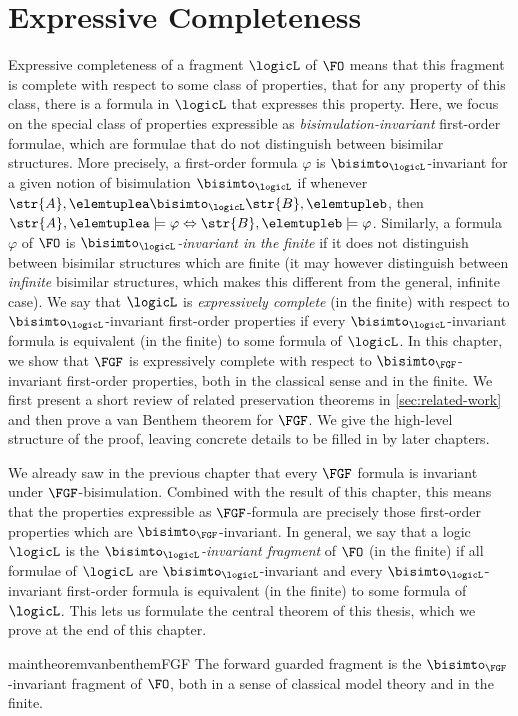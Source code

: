 \chapter{Expressive Completeness}\label{chap:expressivity}
Expressive completeness of a fragment $\logicL$ of $\FO$ means that this fragment is complete with respect to some class of properties, \ie{} that for any property of this class, there is a formula in $\logicL$ that expresses this property.
Here, we focus on the special class of properties expressible as \emph{bisimulation-invariant} first-order formulae, which are formulae that do not distinguish between bisimilar structures.
More precisely, a first-order formula $\varphi$ is $\bisimto_{\logicL}$-invariant for a given notion of bisimulation $\bisimto_{\logicL}$ if whenever $\str{A}, \elemtuplea \bisimto_{\logicL} \str{B}, \elemtupleb$, then $\str{A}, \elemtuplea \models \varphi \Leftrightarrow \str{B}, \elemtupleb \models \varphi$.
Similarly, a formula $\varphi$ of $\FO$ is \emph{$\bisimto_{\logicL}$-invariant in the finite} if it does not distinguish between bisimilar structures which are finite (it may however distinguish between \emph{infinite} bisimilar structures, which makes this different from the general, infinite case).
We say that $\logicL$ is \emph{expressively complete} (in the finite) with respect to $\bisimto_{\logicL}$-invariant first-order properties if every $\bisimto_{\logicL}$-invariant formula is equivalent (in the finite) to some formula of $\logicL$.
In this chapter, we show that $\FGF$ is expressively complete with respect to $\bisimto_{\FGF}$-invariant first-order properties, both in the classical sense and in the finite.
We first present a short review of related preservation theorems in \cref{sec:related-work} and then prove a van Benthem theorem for $\FGF$.
We give the high-level structure of the proof, leaving concrete details to be filled in by later chapters.

We already saw in the previous chapter that every $\FGF$ formula is invariant under $\FGF$-bisimulation.
Combined with the result of this chapter, this means that the properties expressible as $\FGF$-formula are precisely those first-order properties which are $\bisimto_{\FGF}$-invariant.
In general, we say that a logic $\logicL$ is the \emph{$\bisimto_{\logicL}$-invariant fragment} of $\FO$ (in the finite) if all formulae of $\logicL$ are $\bisimto_{\logicL}$-invariant and every $\bisimto_{\logicL}$-invariant first-order formula is equivalent (in the finite) to some formula of $\logicL$.
This lets us formulate the central theorem of this thesis, which we prove at the end of this chapter.
\begin{restatable*}{maintheorem}{vanbenthemFGF}\label{thm:main}
The forward guarded fragment is the $\bisimto_{\FGF}$-invariant fragment of $\FO$, both in a sense of classical model theory and in the finite.
\end{restatable*}

